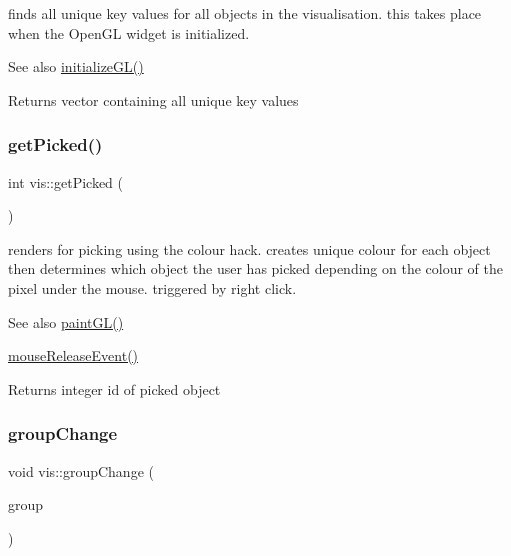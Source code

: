 finds all unique key values for all objects in the visualisation. this takes place when the Open\+GL widget is initialized.

\begin{DoxySeeAlso}{See also}
\mbox{\hyperlink{classvis_aacc3b133f9fae3b66e1e13bfe789f314}{initialize\+G\+L()}} 
\end{DoxySeeAlso}
\begin{DoxyReturn}{Returns}
vector containing all unique key values 
\end{DoxyReturn}
\mbox{\label{classvis_a9d1f882814f73ee4e49dbeb7102b008c}} 
\subsubsection{\texorpdfstring{get\+Picked()}{getPicked()}}
{\footnotesize\ttfamily int vis\+::get\+Picked (\begin{DoxyParamCaption}{ }\end{DoxyParamCaption})}

renders for picking using the colour hack. creates unique colour for each object then determines which object the user has picked depending on the colour of the pixel under the mouse. triggered by right click.

\begin{DoxySeeAlso}{See also}
\mbox{\hyperlink{classvis_ace835462bb98cad495e829c08e1a26ea}{paint\+G\+L()}} 

\mbox{\hyperlink{classvis_a0c2adf27376ef0d784febfc572cd8729}{mouse\+Release\+Event()}} 
\end{DoxySeeAlso}
\begin{DoxyReturn}{Returns}
integer id of picked object 
\end{DoxyReturn}
\mbox{\label{classvis_aacae1519b8fc0799f9d3676bd35ab957}} 
\subsubsection{\texorpdfstring{group\+Change}{groupChange}}
{\footnotesize\ttfamily void vis\+::group\+Change (\begin{DoxyParamCaption}\item[{Q\+String}]{group }\end{DoxyParamCaption})\hspace{0.3cm}{\ttfamily [slot]}}

